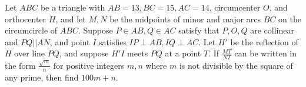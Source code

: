 Let $ABC$ be a triangle with $AB=13,BC=15,AC=14$, circumcenter $O$, and orthocenter $H$, and let $M,N$ be the midpoints of minor and major arcs $BC$ on the circumcircle of $ABC$. Suppose $P\in AB, Q\in AC$ satisfy that $P,O,Q$ are collinear and $PQ||AN$, and point $I$ satisfies $IP\perp AB,IQ\perp AC$. Let $H'$ be the reflection of $H$ over line $PQ$, and suppose $H'I$ meets $PQ$ at a point $T$. If $\frac{MT}{NT}$ can be written in the form $\frac{\sqrt{m}}{n}$ for positive integers $m,n$ where $m$ is not divisible by the square of any prime, then find $100m+n$.
